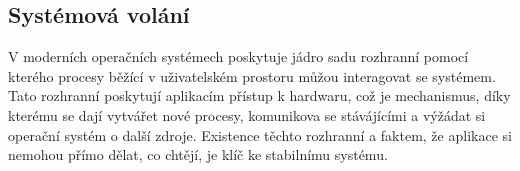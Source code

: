 \iffalse
https://www.kernel.org/doc/Documentation/trace/events.rst
\fi

\subsection{Systémová volání}

V moderních operačních systémech poskytuje jádro sadu rozhranní pomocí kterého procesy běžící v uživatelském prostoru můžou interagovat
se systémem. Tato rozhranní poskytují aplikacím přístup k hardwaru, což je mechanismus, díky kterému se dají vytvářet nové procesy,
komunikova se stávájícími a výžádat si operační systém o další zdroje. Existence těchto rozhranní a faktem, že aplikace si nemohou přímo
dělat, co chtějí, je klíč ke stabilnímu systému.

\iffalse
BOOK Linux Kernel Development 3rd edition page 69
\fi